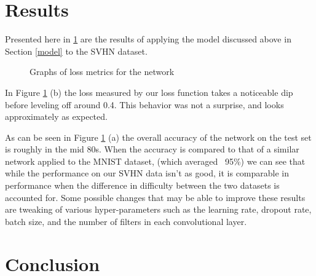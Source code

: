 \documentclass{article}
\begin{document}
	\section{Results}
	\label{results}
	
	Presented here in \ref{fig:metrics} are the results of applying the model discussed above in Section \ref{model} to the SVHN dataset. 
	
	\begin{figure}[!htb]
		\centering
		\qquad
		\caption{Graphs of loss metrics for the network}%
		\label{fig:metrics}%
	\end{figure}
	
	
	In Figure \ref{fig:metrics} (b) the loss measured by our loss function takes a noticeable dip before leveling off around 0.4.  This behavior was not a surprise, and looks approximately as expected.
	
	As can be seen in Figure \ref{fig:metrics} (a) the overall accuracy of the network on the test set is roughly in the mid 80s.  When the accuracy is compared to that of a similar network applied to the MNIST dataset, (which averaged ~95\%) we can see that while the performance on our SVHN data isn't as good, it is  comparable in performance when the difference in difficulty between the two datasets is accounted for. Some possible changes that may be able to improve these results are tweaking of various hyper-parameters such as the learning rate, dropout rate, batch size, and the number of filters in each convolutional layer.
	
	\section{Conclusion}
	\label{conc}
	
\end{document}

